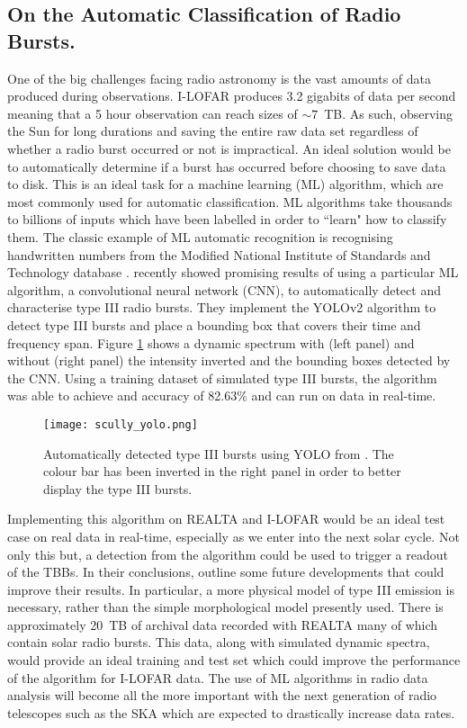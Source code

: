 \subsection{On the Automatic Classification of Radio Bursts.}
One of the big challenges facing radio astronomy is the vast amounts of data produced during observations. I-LOFAR produces 3.2 gigabits of data per second meaning that a 5 hour observation can reach sizes of $\sim 7$~TB. As such, observing the Sun for long durations and saving the entire raw data set regardless of whether a radio burst occurred or not is impractical. An ideal solution would be to automatically determine if a burst has occurred before choosing to save data to disk. 
This is an ideal task for a machine learning (ML) algorithm, which are most commonly used for automatic classification. ML algorithms take thousands to billions of inputs which have been labelled in order to ``learn" how to classify them. The classic example of ML automatic recognition is recognising handwritten numbers from the Modified National Institute of Standards and Technology database \citep[MNIST;][]{LeCun1998}.
\cite{Scully2021} recently showed promising results of using a particular ML algorithm, a convolutional neural network (CNN), to automatically detect and characterise type III radio bursts. They implement the YOLOv2 \citep[You Only Look Once;][]{Yolo9000} algorithm to detect type III bursts and place a bounding box that covers their time and frequency span. Figure \ref{fig:yolo} shows a dynamic spectrum with (left panel) and without (right panel) the intensity inverted and the bounding boxes detected by the CNN. Using a training dataset of simulated type III bursts, the algorithm was able to achieve and accuracy of 82.63$\%$ and can run on data in real-time.  

\begin{figure}[ht]
\centering
\texttt{[image: scully\_yolo.png]}
\caption[Automatically detected type III bursts using YOLO.]{Automatically detected type III bursts using YOLO from \cite{Scully2021}. The colour bar has been inverted in the right panel in order to better display the type III bursts. }
\label{fig:yolo}
\end{figure}

Implementing this algorithm on REALTA and I-LOFAR would be an ideal test case on real data in real-time, especially as we enter into the next solar cycle. Not only this but, a detection from the algorithm could be used to trigger a readout of the TBBs.
In their conclusions, \cite{Scully2021} outline some future developments that could improve their results. In particular, a more physical model of type III emission is necessary, rather than the simple morphological model presently used. There is approximately 20~TB of archival data recorded with REALTA many of which contain solar radio bursts. This data, along with simulated dynamic spectra, would provide an ideal training and test set which could improve the performance of the algorithm for I-LOFAR data. The use of ML algorithms in radio data analysis will become all the more important with the next generation of radio telescopes such as the SKA which are expected to drastically increase data rates.

